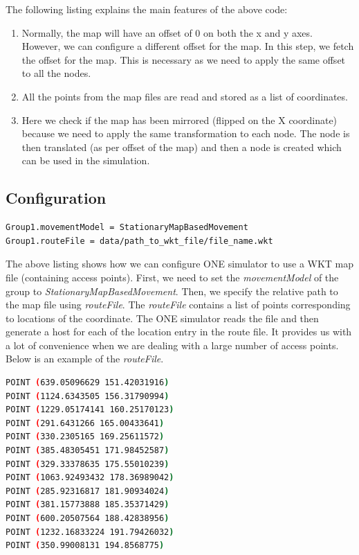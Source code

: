 \vspace{5mm}
The following listing explains the main features of the above code:
\begin{enumerate}
	\item Normally, the map will have an offset of 0 on both the x and y axes. However, we can configure a different offset for the map. In this step, we fetch the offset for the map. This is necessary as we need to apply the same offset to all the nodes.
	\item All the points from the map files are read and stored as a list of coordinates.
	\item Here we check if the map has been mirrored (flipped on the X coordinate) because we need to apply the same transformation to each node. The node is then translated (as per offset of the map) and then a node is created which can be used in the simulation.
\end{enumerate}
\subsection{Configuration}
\begin{lstlisting}[language=bash]
Group1.movementModel = StationaryMapBasedMovement
Group1.routeFile = data/path_to_wkt_file/file_name.wkt
\end{lstlisting}
The above listing shows how we can configure ONE simulator to use a WKT map file (containing access points). First, we need to  set the \textit{movementModel} of the group to \textit{StationaryMapBasedMovement}. Then, we specify the relative path to the map file using \textit{routeFile}. The \textit{routeFile} contains a list of points corresponding to locations of the coordinate. The ONE simulator reads the file and then generate a host for each of the location entry in the route file. It provides us with a lot of convenience when we are dealing with a large number of access points. Below is an example of the \textit{routeFile}.\newline
\begin{lstlisting}[language=bash]
POINT (639.05096629 151.42031916)
POINT (1124.6343505 156.31790994)
POINT (1229.05174141 160.25170123)
POINT (291.6431266 165.00433641)
POINT (330.2305165 169.25611572)
POINT (385.48305451 171.98452587)
POINT (329.33378635 175.55010239)
POINT (1063.92493432 178.36989042)
POINT (285.92316817 181.90934024)
POINT (381.15773888 185.35371429)
POINT (600.20507564 188.42838956)
POINT (1232.16833224 191.79426032)
POINT (350.99008131 194.8568775)
\end{lstlisting}
